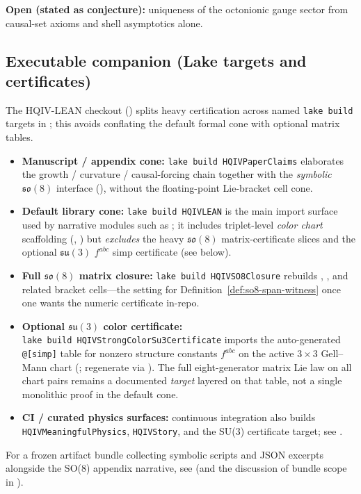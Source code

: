\documentclass[11pt]{amsart}
\begin{document}
\textbf{Open (stated as conjecture):} uniqueness of the octonionic gauge sector from causal-set axioms and shell asymptotics alone.

\subsection{Executable companion (Lake targets and certificates)}
\label{subsec:lake-targets}
The HQIV-LEAN checkout (\cite{hqiv-lean}) splits heavy certification across named \texttt{lake\ build} targets in ; this avoids conflating the default formal cone with optional matrix tables.
\begin{itemize}
  \item \textbf{Manuscript / appendix cone:} \texttt{lake\ build\ HQIVPaperClaims} elaborates the growth / curvature / causal-forcing chain together with the \emph{symbolic} \(\mathfrak{so}(8)\) interface (), without the floating-point Lie-bracket cell cone.
  \item \textbf{Default library cone:} \texttt{lake\ build\ HQIVLEAN} is the main import surface used by narrative modules such as ; it includes triplet-level \emph{color chart} scaffolding (, ) but \emph{excludes} the heavy \(\mathfrak{so}(8)\) matrix-certificate slices and the optional \(\mathfrak{su}(3)\) \(f^{abc}\) simp certificate (see below).
  \item \textbf{Full \(\mathfrak{so}(8)\) matrix closure:} \texttt{lake\ build\ HQIVSO8Closure} rebuilds , , and related bracket cells---the setting for Definition~\ref{def:so8-span-witness} once one wants the numeric certificate in-repo.
  \item \textbf{Optional \(\mathfrak{su}(3)\) color certificate:} \texttt{lake\ build\ HQIVStrongColorSu3Certificate} imports the auto-generated \texttt{@[simp]} table for nonzero structure constants \(f^{abc}\) on the active \(3\times 3\) Gell--Mann chart (; regenerate via ). The full eight-generator matrix Lie law on all chart pairs remains a documented \emph{target} layered on that table, not a single monolithic proof in the default cone.
  \item \textbf{CI / curated physics surfaces:} continuous integration also builds \texttt{HQIVMeaningfulPhysics}, \texttt{HQIVStory}, and the SU(3) certificate target; see .
\end{itemize}
For a frozen artifact bundle collecting symbolic scripts and JSON excerpts alongside the SO(8) appendix narrative, see  (and the discussion of bundle scope in ).
\end{document}
